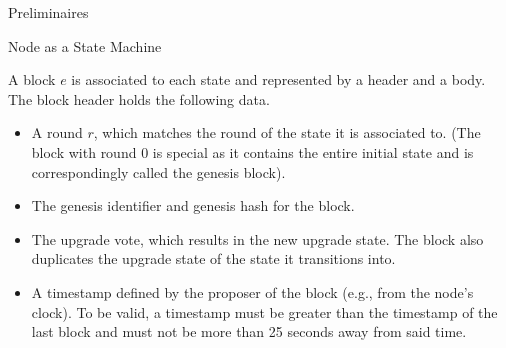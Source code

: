 \documentclass[10pt,a4paper]{article}
\begin{document}
\begin{section}{Preliminaires}
\begin{subsection}{Node as a State Machine}



A {\sf block} $e$ is associated to each state and represented by a 
header and a body. The block header holds the following data.
\begin{itemize}
    \item
    A round $r$, which matches the round of the state it is associated to. 
    (The block with round 0 is special as it contains the entire initial state
    and is correspondingly called the genesis block).
    
    \item
    The genesis identifier and genesis hash for the block.
    
    \item
    The upgrade vote, which results in the new upgrade state. 
    The block also duplicates the upgrade state of the state it transitions into.
    
    \item
    A timestamp defined by the proposer of the block (e.g., from the node's clock). 
    To be valid, a timestamp must be greater than the timestamp of the last block and 
    must not be more than 25 seconds away from said time.
    

\end{itemize}
\end{subsection}
\end{section}
\end{document}
